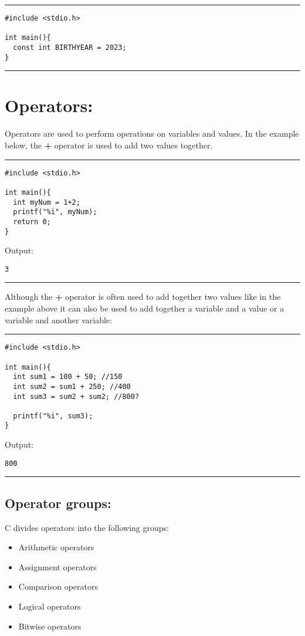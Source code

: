 \documentclass[a4paper]{article}
\begin{document}
\noindent\rule{\textwidth}{0.5pt}
\begin{verbatim}
#include <stdio.h>

int main(){
  const int BIRTHYEAR = 2023;
}
\end{verbatim}

\noindent\rule{\textwidth}{0.5pt}
\clearpage
\section{Operators:}
\label{sec:org9fdc3ba}
Operators are used to perform operations on variables and values.
In the example below, the \textbf{+} operator is used to add two values together.

\noindent\rule{\textwidth}{0.5pt}
\begin{verbatim}
#include <stdio.h>

int main(){
  int myNum = 1+2;
  printf("%i", myNum);
  return 0;
}
\end{verbatim}
Output:
\begin{verbatim}
3
\end{verbatim}

\noindent\rule{\textwidth}{0.5pt}
Although the \textbf{+} operator is often used to add together two values like in the
example above it can also be used to add together a variable and a value or a
variable and another variable:

\noindent\rule{\textwidth}{0.5pt}
\begin{verbatim}
#include <stdio.h>

int main(){
  int sum1 = 100 + 50; //150 
  int sum2 = sum1 + 250; //400
  int sum3 = sum2 + sum2; //800?

  printf("%i", sum3);
}
\end{verbatim}
Output:
\begin{verbatim}
800
\end{verbatim}

\noindent\rule{\textwidth}{0.5pt}
\subsection{Operator groups:}
\label{sec:orgebf82cc}
C divides operators into the following groups:
\begin{itemize}
\item Arithmetic operators
\item Assignment operators
\item Comparison operators
\item Logical operators
\item Bitwise operators
\end{itemize}
\end{document}
